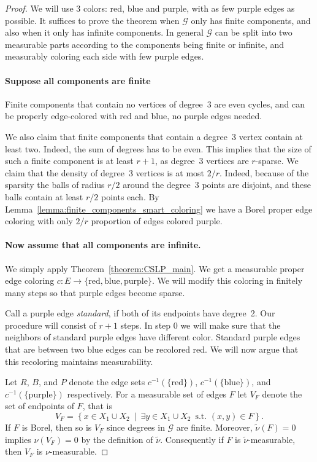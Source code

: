 \documentclass[11pt]{article}
\theoremstyle{definition}
\numberwithin{equation}{section}
\numberwithin{figure}{section}
\numberwithin{table}{section}
\newcommand{\G}{\mathcal{G}}
\newcommand{\redl}{\mathrm{red}}
\newcommand{\bluel}{\mathrm{blue}}
\newcommand{\purpll}{\mathrm{purple}}
\let\oldexists\exists
\renewcommand*{\exists}{\mathrel{\oldexists}}
\begin{document}
\begin{proof}
We will use 3 colors: red, blue and purple, with as few purple edges as possible. It suffices to prove the theorem when $\G$ only has finite components, and also when it only has infinite components. In general $\G$ can be split into two measurable parts according to the components being finite or infinite, and measurably coloring each side with few purple edges.


\paragraph{Suppose all components are finite} Finite components that contain no vertices of degree~3 are even cycles, and can be properly edge-colored with red and blue, no purple edges needed.

We also claim that finite components that contain a degree~3 vertex contain at least two. Indeed, the sum of degrees has to be even. This implies that the size of such a finite component is at least $r+1$, as degree~3 vertices are $r$-sparse. We claim that the density of degree~3 vertices is at most $2/r$. Indeed, because of the sparsity the balls of radius $r/2$ around the degree~3 points are disjoint, and these balls contain at least $r/2$ points each. By Lemma~\ref{lemma:finite_components_smart_coloring} we have a Borel proper edge coloring with only $2/r$ proportion of edges colored purple.


\paragraph{Now assume that all components are infinite.}
We simply apply Theorem~\ref{theorem:CSLP_main}. We get a measurable proper edge coloring $c:E \to \{\redl, \bluel, \purpll\}$. We will modify this coloring in finitely many steps so that purple edges become sparse.

Call a purple edge \emph{standard}, if both of its endpoints have degree~2. Our procedure will consist of $r+1$ steps. In step 0 we will make sure that the neighbors of standard purple edges have different color. Standard purple edges that are between two blue edges can be recolored red. We will now argue that this recoloring maintains measurability.

Let $R$, $B$, and $P$ denote the edge sets $c^{-1}(\{\redl\})$, $c^{-1}(\{\bluel\})$, and $c^{-1}(\{\purpll\})$ respectively. For a measurable set of edges $F$ let $V_F$ denote the set of endpoints of $F$, that is
\[
V_F=\left\{x \in X_1 \cup X_2~\middle|~\exists y \in X_1 \cup X_2\, \text{ s.t. } (x,y) \in F\right\}.
\]
If $F$ is Borel, then so is $V_F$ since degrees in $\G$ are finite. Moreover, $\widetilde{\nu}(F)=0$ implies $\nu(V_F)=0$ by the definition of $\widetilde{\nu}$. Consequently if $F$ is $\widetilde{\nu}$-measurable, then $V_F$ is $\nu$-measurable.


\end{proof}
\end{document}
